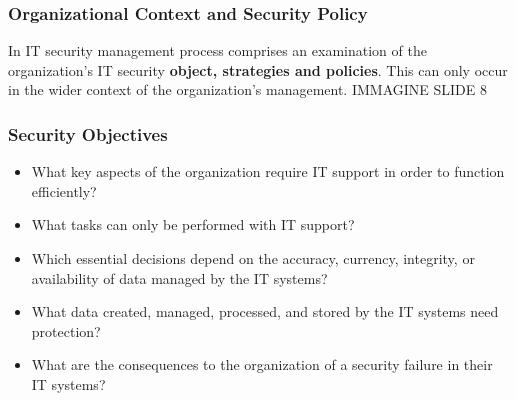 \documentclass[xcolor ={table,usenames,dvipsnames}]{beamer}
\theoremstyle{definition}
\begin{document}

	\begin{frame}
		\frametitle{Organizational Context and Security Policy}
		In IT security management process comprises an examination of the organization's IT security \textbf{object, strategies and policies}. This can only occur in the wider context of the organization's management.
		IMMAGINE SLIDE 8
	\end{frame}

	\begin{frame}
		\frametitle{Security Objectives}
		\begin{itemize}
			\item What key aspects of the organization require IT support in order to function efficiently?
			\item What tasks can only be performed with IT support?
			\item Which essential decisions depend on the accuracy, currency, integrity, or availability of data managed by the IT systems?
			\item What data created, managed, processed, and stored by the IT systems need
			protection?
			\item What are the consequences to the organization of a security failure in their IT systems?
		\end{itemize}
	\end{frame}
\end{document}
